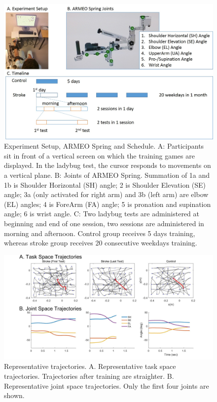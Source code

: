 \begin{figure}
	\centering
	\includegraphics[width=1\linewidth]{figures/1setup&schedule}
	\caption[Experiment Setup and Schedule]
	{Experiment Setup, ARMEO Spring and Schedule. 
		A: Participants sit in front of a vertical screen on which the training games are displayed. In the ladybug test, the cursor responds to movements on a vertical plane. 
		B: Joints of ARMEO Spring. Summation of 1a and 1b is Shoulder Horizontal (SH) angle; 2 is Shoulder Elevation (SE) angle; 3a (only activated for right arm) and 3b (left arm) are elbow (EL) angles; 4 is ForeArm (FA) angle; 5 is pronation and supination angle; 6 is wrist angle.
		C: Two ladybug tests are administered at beginning and end of one session, two sessions are administered in morning and afternoon. Control group receives 5 days training, whereas stroke group receives 20 consecutive weekdays training.}
	\label{fig:1setupschedule}
\end{figure}

\begin{figure}
	\centering
	\includegraphics[width=1\linewidth]{figures/2strokeTrajExamp}
	\caption[Example trajectories]
	{Representative trajectories. 
		A. Representative task space trajectories. Trajectories after training are straighter.
		B. Representative joint space trajectories. Only the first four joints are shown.}
	\label{fig:2stroketrajexamp}
\end{figure}


